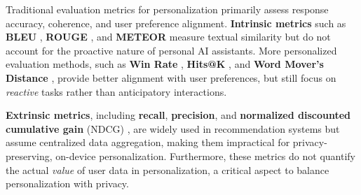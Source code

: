 Traditional evaluation metrics for personalization primarily assess response accuracy, coherence, and user preference alignment. \textbf{Intrinsic metrics} such as \textbf{BLEU} \cite{papineni-etal-2002-bleu}, \textbf{ROUGE} \cite{lin-2004-rouge}, and \textbf{METEOR} \cite{banerjee-lavie-2005-meteor} measure textual similarity but do not account for the proactive nature of personal AI assistants. More personalized evaluation methods, such as \textbf{Win Rate} \cite{zhang2024personalizationlargelanguagemodels}, \textbf{Hits@K} \cite{mazaré2018trainingmillionspersonalizeddialogue}, and \textbf{Word Mover’s Distance} \cite{ghorbani2019automaticconceptbasedexplanations}, provide better alignment with user preferences, but still focus on \emph{reactive} tasks rather than anticipatory interactions.

\textbf{Extrinsic metrics}, including \textbf{recall}, \textbf{precision}, and \textbf{normalized discounted
cumulative gain} (NDCG) \cite{wang2013theoreticalanalysisndcgtype}, are widely used in recommendation systems but assume centralized data aggregation, making them impractical for privacy-preserving, on-device personalization. Furthermore, these metrics do not quantify the actual \emph{value} of user data in personalization, a critical aspect to balance personalization with privacy.